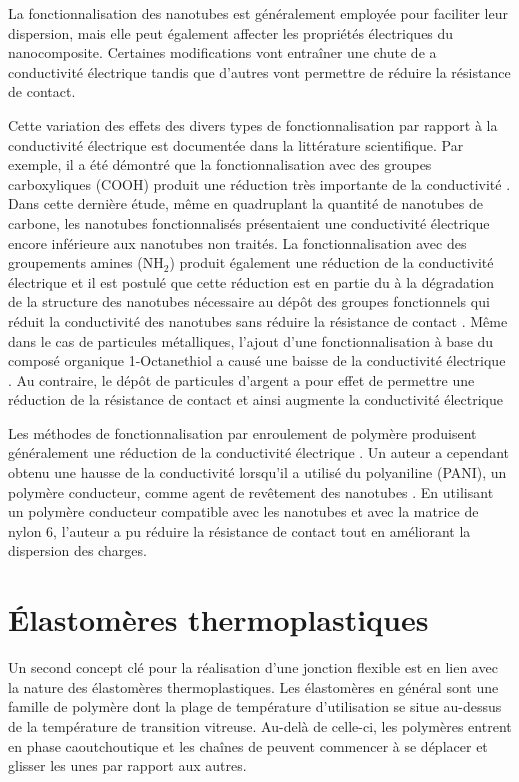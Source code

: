 La fonctionnalisation des nanotubes est généralement employée pour faciliter leur dispersion, mais elle peut également affecter les propriétés électriques du nanocomposite. 
Certaines modifications vont entraîner une chute de a conductivité électrique tandis que d'autres vont permettre de réduire la résistance de contact. 

Cette variation des effets des divers types de fonctionnalisation par rapport à la conductivité électrique est documentée dans la littérature scientifique. 
Par exemple, il a été démontré que la fonctionnalisation avec des groupes carboxyliques (COOH) produit une réduction très importante de la conductivité \cite{Guadagno2011}. 
Dans cette dernière étude, même en quadruplant la quantité de nanotubes de carbone, les nanotubes fonctionnalisés présentaient une conductivité électrique encore inférieure aux nanotubes non traités. 
La fonctionnalisation avec des groupements amines (NH$_2$) produit également une réduction de la conductivité électrique \cite{Ma2008} et il est postulé que cette réduction est en partie du à la dégradation de la structure des nanotubes nécessaire au dépôt des groupes fonctionnels qui réduit la conductivité des nanotubes sans réduire la résistance de contact \cite{Pandey2012a}.
Même dans le cas de particules métalliques, l'ajout d'une fonctionnalisation à base du composé organique 
1-Octanethiol a causé une baisse de la conductivité électrique \cite{Gelves2008a}. 
Au contraire, le dépôt de particules d'argent a pour effet de permettre une réduction de la résistance de contact et ainsi augmente la conductivité électrique  \cite{Ma2010,Cauchy2017}

Les méthodes de fonctionnalisation par enroulement de polymère produisent généralement une réduction de la conductivité électrique \cite{Diez-Pascual2010, Huang2012}. 
Un auteur a cependant obtenu une hausse de la conductivité lorsqu'il a utilisé du polyaniline (PANI), un polymère conducteur, comme agent de revêtement des nanotubes \cite{Vankayala2011}. 
En utilisant un polymère conducteur compatible avec les nanotubes et avec la matrice de nylon 6, l'auteur a pu réduire la résistance de contact tout en améliorant la dispersion des charges. 

\FloatBarrier
\section{Élastomères thermoplastiques}  

Un second concept clé pour la réalisation d'une jonction flexible est en lien avec la nature des élastomères thermoplastiques. 
Les élastomères en général sont une famille de polymère dont la plage de température d'utilisation se situe au-dessus de la température de transition vitreuse. 
Au-delà de celle-ci, les polymères entrent en phase caoutchoutique et les chaînes de peuvent commencer à se déplacer et glisser les unes par rapport aux autres. 

